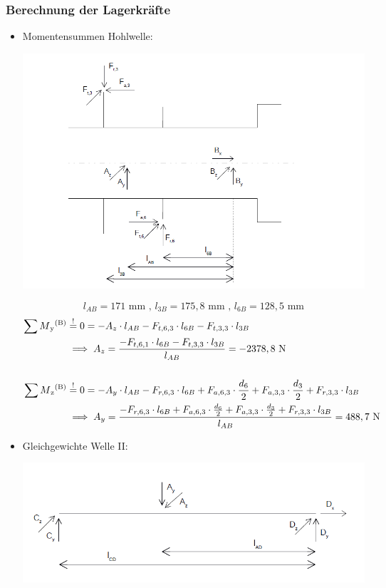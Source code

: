 \subsubsection{Berechnung der Lagerkräfte}
\begin{itemize}
	\item Momentensummen Hohlwelle:
	\begin{center}
		\includegraphics[width=1.2\textwidth,keepaspectratio]{figures/Gang3Hohl.png}
	\end{center}
\[l_{AB} =171\text{ mm} \text{ , } l_{3B} = 175,8\text{ mm} \text{ , } l_{6B} = 128,5\text{ mm}  \]
	\begin{align*}
	\sum M\textsubscript{y}\textsuperscript{(B)} &\overset{!}{=} 0 = -A_z \cdot l_{AB} - F_{t,6,3} \cdot l_{6B} - F_{t,3,3} \cdot l_{3B} \\
	&\implies A_z =  \frac{-F_{t,6,1} \cdot l_{6B} - F_{t,3,3} \cdot l_{3B}}{l_{AB}} = -2378,8\text{ N} \\ \\
	\sum M\textsubscript{z}\textsuperscript{(B)} &\overset{!}{=} 0 = -A_y \cdot l_{AB} - F_{r,6,3} \cdot l_{6B} + F_{a,6,3} \cdot \frac{d_6}{2} + F_{a,3,3} \cdot \frac{d_3}{2} + F_{r,3,3} \cdot l_{3B}\\
	&\implies A_y = \frac{-F_{r,6,3} \cdot l_{6B} + F_{a,6,3} \cdot \frac{d_6}{2} +F_{a,3,3} \cdot \frac{d_3}{2} + F_{r,3,3} \cdot l_{3B}} {l_{AB}}= 488,7 \text{ N} 
	\end{align*}
	\newpage
	\item Gleichgewichte Welle II:
	\begin{center}
		\includegraphics[width=1.04\textwidth,keepaspectratio]{figures/Gang3.png}

\end{center}
\end{itemize}

